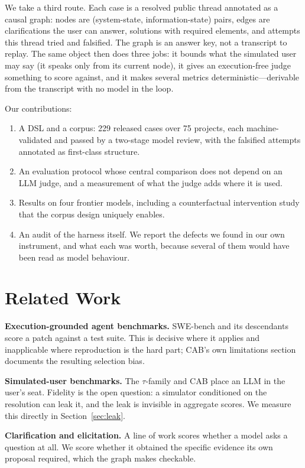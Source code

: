 \documentclass{article}
\begin{document}
We take a third route. Each case is a resolved public thread annotated as
a causal graph: nodes are (system-state, information-state) pairs, edges
are clarifications the user can answer, solutions with required elements,
and attempts this thread tried and falsified. The graph is an answer key,
not a transcript to replay. The same object then does three jobs: it
bounds what the simulated user may say (it speaks only from its current
node), it gives an execution-free judge something to score against, and
it makes several metrics deterministic---derivable from the transcript
with no model in the loop.

Our contributions:

\begin{enumerate}
\item A DSL and a corpus: 229 released cases over 75 projects, each
      machine-validated and passed by a two-stage model review, with the
      falsified attempts annotated as first-class structure.
\item An evaluation protocol whose central comparison does not depend on
      an LLM judge, and a measurement of what the judge adds where it is
      used.
\item Results on four frontier models, including a counterfactual
      intervention study that the corpus design uniquely enables.
\item An audit of the harness itself. We report the defects we found in
      our own instrument, and what each was worth, because several of
      them would have been read as model behaviour.
\end{enumerate}

\section{Related Work}
\label{sec:related}

\textbf{Execution-grounded agent benchmarks.} SWE-bench and its
descendants score a patch against a test suite. This is decisive where
it applies and inapplicable where reproduction is the hard part;
CAB's own limitations section documents the resulting selection bias.

\textbf{Simulated-user benchmarks.} The $\tau$-family and CAB place an
LLM in the user's seat. Fidelity is the open question: a simulator
conditioned on the resolution can leak it, and the leak is invisible in
aggregate scores. We measure this directly in Section~\ref{sec:leak}.

\textbf{Clarification and elicitation.} A line of work scores whether a
model asks a question at all. We score whether it obtained the specific
evidence its own proposal required, which the graph makes checkable.
\end{document}
